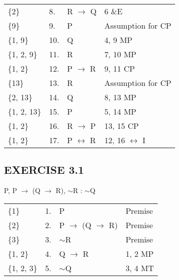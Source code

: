 \documentclass[a4paper,12pt]{article}
\newcommand{\mra}{$\rightarrow$ }
\newcommand{\mlra}{$\leftrightarrow$ }
\newcommand{\ms}{$\sim$}
\begin{document}
\begin{enumerate}[label=\arabic*,leftmargin=*]
\begin{enumerate}[label=\arabic*.]
\begin{minipage}{\textwidth}
\begin{tabular}{l l l l}
                        \{2\} & 8. & R \mra Q & 6 \&E\\
                        \{9\} & 9. & P & Assumption for CP\\
                        \{1, 9\} & 10. & Q & 4, 9 MP\\
                        \{1, 2, 9\} & 11. & R & 7, 10 MP\\
                        \{1, 2\} & 12. & P \mra R & 9, 11 CP\\
                        \{13\} & 13. & R & Assumption for CP\\
                        \{2, 13\} & 14. & Q & 8, 13 MP\\
                        \{1, 2, 13\} & 15. & P & 5, 14 MP\\
                        \{1, 2\} & 16. & R \mra P & 13, 15 CP\\
                        \{1, 2\} & 17. & P \mlra R & 12, 16 \mlra I\\
                    \end{tabular}
                \end{minipage}

            \end{enumerate}

    \end{enumerate}

    \subsection*{EXERCISE 3.1}

    \begin{enumerate}[label=\arabic*,leftmargin=*]

        \begin{minipage}{\textwidth}
        \item P, P \mra (Q \mra R), \ms R : \ms Q
            \nopagebreak
            \vspace{1em}\\
            \begin{tabular}{l l l l}
                \{1\} & 1. & P & Premise\\
                \{2\} & 2. & P \mra (Q \mra R) & Premise\\
                \{3\} & 3. & \ms R & Premise\\
                \{1, 2\} & 4. & Q \mra R & 1, 2 MP\\
                \{1, 2, 3\} & 5. & \ms Q & 3, 4 MT\\
            \end{tabular}
        \end{minipage}

    \end{enumerate}
\end{document}
